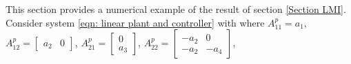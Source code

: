 This section provides a numerical example of the result of section \ref{Section LMI}.
%
Consider system \eqref{eqn: linear plant and controller} with
where $A_{11}^p = a_1$, 
$A_{12}^p = \left[ \begin{smallmatrix}
    a_2 & 0
\end{smallmatrix} \right]$,
$A_{21}^p = \left[ \begin{smallmatrix}
    0 \\ a_3
\end{smallmatrix} \right]$,
$A_{22}^p = \left[ \begin{smallmatrix}
    -a_2 & 0 \\ -a_2 & -a_4
\end{smallmatrix} \right]$,
